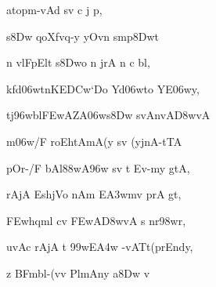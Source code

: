 {\dn atopm-vAd\2 sv{\rdt} c j\? p, \vegdn\dontdisplaylinenum}

{\dn s\38Dw qoXfvq\0-y yOvn\2 smp\38Dwt{\dandabdn} \dontdisplaylinenum}

{\dn n vlFpElt\2 s\38Dwo n jrA n c b\0l, \vegdn\dontdisplaylinenum}

{\dn k\?fd\306wtnKE\3DCw`Do Yd\306wto Y\?E\306wy,{\dandabdn} \dontdisplaylinenum}

{\dn t\?j\396wb\0l\3FEwAZA\306ws\38Dw svA\0nvA\3D8wvA \vegdn\dontdisplaylinenum}

{\dn m\306w/F roEhtAmA(y sv\?{\qvb} (yjnA-tTA{\dandabdn} \dontdisplaylinenum}

{\dn pOr-/F bAl\388wA\396w sv\?{\qvb} t\? Ev-my\2 gtA, \vegdn\dontdisplaylinenum}

{\dn rAjA Es\2hjVo nAm E\3A3wm\?v prA\2 gt,{\dandabdn} \dontdisplaylinenum}

{\dn \3FEwhq\0ml\2 c\4v \3FEwA\3D8wvA s nr\?\398wr, \vegdn\dontdisplaylinenum}

{\dn uvAc rAjA t\2 \399w\?E\3A4w\2 -vAT\0t(prEnd\0y,{\dandabdn} \dontdisplaylinenum}

{\dn {}z BFmbl-(v\?v\2 PlmAny a\38Dw v\4 \vegdn\dontdisplaylinenum}

